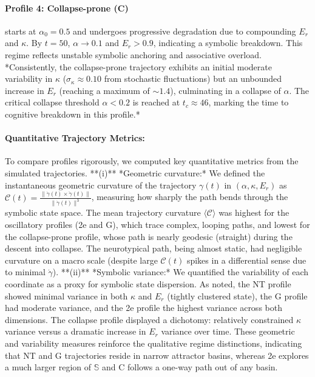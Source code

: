 \paragraph{Profile 4: Collapse-prone (C)} starts at $\alpha_0 = 0.5$ and undergoes progressive degradation due to compounding $E_r$ and $\kappa$. By $t = 50$, $\alpha \rightarrow 0.1$ and $E_r > 0.9$, indicating a symbolic breakdown. This regime reflects unstable symbolic anchoring and associative overload. *Consistently, the collapse-prone trajectory exhibits an initial moderate variability in $\kappa$ ($\sigma_{\kappa}\approx0.10$ from stochastic fluctuations) but an unbounded increase in $E_r$ (reaching a maximum of $\sim1.4$), culminating in a collapse of $\alpha$. The critical collapse threshold $\alpha<0.2$ is reached at $t_c \approx 46$, marking the time to cognitive breakdown in this profile.*

\paragraph{Quantitative Trajectory Metrics:} To compare profiles rigorously, we computed key quantitative metrics from the simulated trajectories. **(i)** *Geometric curvature:* We defined the instantaneous geometric curvature of the trajectory $\gamma(t)$ in $(\alpha,\kappa,E_r)$ as $\mathcal{C}(t) = \frac{\|\dot{\gamma}(t)\times \ddot{\gamma}(t)\|}{\|\dot{\gamma}(t)\|^3}$, measuring how sharply the path bends through the symbolic state space. The mean trajectory curvature $\langle \mathcal{C}\rangle$ was highest for the oscillatory profiles (2e and G), which trace complex, looping paths, and lowest for the collapse-prone profile, whose path is nearly geodesic (straight) during the descent into collapse. The neurotypical path, being almost static, had negligible curvature on a macro scale (despite large $\mathcal{C}(t)$ spikes in a differential sense due to minimal $\dot{\gamma}$). **(ii)** *Symbolic variance:* We quantified the variability of each coordinate as a proxy for symbolic state dispersion. As noted, the NT profile showed minimal variance in both $\kappa$ and $E_r$ (tightly clustered state), the G profile had moderate variance, and the 2e profile the highest variance across both dimensions. The collapse profile displayed a dichotomy: relatively constrained $\kappa$ variance versus a dramatic increase in $E_r$ variance over time. These geometric and variability measures reinforce the qualitative regime distinctions, indicating that NT and G trajectories reside in narrow attractor basins, whereas 2e explores a much larger region of $\mathbb{S}$ and C follows a one-way path out of any basin.

